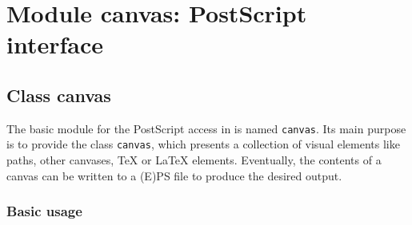 \chapter{Module canvas: PostScript interface}

\label{canvas}

\section{Class canvas}

The basic module for the PostScript access in \PyX{} is named
\verb|canvas|. Its main purpose is to provide the class \verb|canvas|,
which presents a collection of visual elements like paths, other
canvases, \TeX{} or \LaTeX{} elements. Eventually, the contents of a canvas 
can be written to a (E)PS file to produce the desired output.

\subsection{Basic usage}

